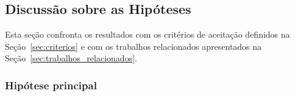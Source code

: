 \documentclass[
    12pt,                %
    openright,           %
    oneside,             %
    a4paper,             %
    english,             %
    brazil               %
]{abntex2}
\begin{document}




\subsection{Discussão sobre as Hipóteses}
\label{sec:res_discussao}

Esta seção confronta os resultados com os critérios de aceitação definidos na Seção~\ref{sec:criterios} e com os trabalhos relacionados apresentados na Seção~\ref{sec:trabalhos_relacionados}.

\subsubsection{Hipótese principal}
\label{sec:res_hipotese_principal}
\end{document}
